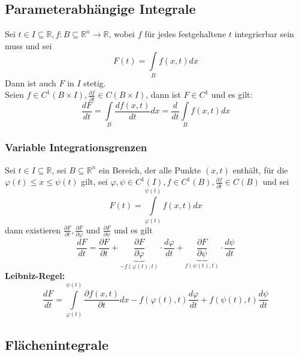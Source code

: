 \documentclass[a4paper,twocolumn,10pt]{article}
\begin{document}
\subsection{Parameterabhängige Integrale}
Sei $t\in I\subseteq \mathbb{R}, f:B\subseteq\mathbb{R}^n\rightarrow\mathbb{R}$, wobei $f$ für jedes festgehaltene $t$ integrierbar sein muss und sei
\begin{equation*}
F(t)=\int\limits_{B}f(x,t)dx
\end{equation*}
Dann ist auch $F$ in $I$ stetig.\\
Seien $f\in C^1(B\times I),\frac{\partial f}{\partial t}\in C(B\times I)$, dann ist $F\in C^1$ und es gilt:
\begin{equation*}
\frac{dF}{dt}=\int\limits_{B}\frac{df(x,t)}{dt}dx=\frac{d}{dt}\int\limits_{B}f(x,t)dx
\end{equation*}

\subsubsection{Variable Integrationsgrenzen}
Sei $t\in I\subseteq\mathbb{R}$, sei $B\subseteq\mathbb{R}^n$ ein Bereich, der alle Punkte $(x,t)$ enthält, für die $\varphi(t)\leq x\leq \psi(t)$ gilt, sei $\varphi,\psi\in C^1(I), f\in C^1(B),\frac{\partial f}{\partial t}\in C(B)$ und sei
\begin{equation*}
F(t)=\int\limits_{\varphi(t)}^{\psi(t)}f(x,t)dx
\end{equation*}
dann existieren $\frac{\partial F}{\partial t},\frac{\partial F}{\partial\varphi}$ und $\frac{\partial F}{\partial \psi}$ und es gilt
\begin{equation*}
\frac{dF}{dt}=\frac{\partial F}{\partial t}+\underbrace{\frac{\partial F}{\partial \varphi}}_{-f(\varphi(t),t)}\cdot\frac{d\varphi}{dt}+\underbrace{\frac{\partial F}{\partial\psi}}_{f(\psi(t),t)}\cdot\frac{d\psi}{dt}
\end{equation*}
\textbf{Leibniz-Regel:}\\
\begin{equation*}
\frac{dF}{dt}=\int\limits_{\varphi(t)}^{\psi(t)}\frac{\partial f(x,t)}{\partial t}dx-f(\varphi(t),t)\frac{d\varphi}{dt}+f(\psi(t),t)\frac{d\psi}{dt}
\end{equation*}

\subsection{Flächenintegrale}
\end{document}
